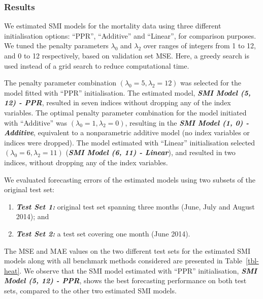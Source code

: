 \documentclass[
  11pt,
  a4paper,
]{article}
\providecommand{\tightlist}{%
  \setlength{\itemsep}{0pt}\setlength{\parskip}{0pt}}\usepackage{longtable,booktabs,array}
\begin{document}
\subsubsection{Results}\label{results}

We estimated SMI models for the mortality data using three different
initialisation options: ``PPR'', ``Additive'' and ``Linear'', for
comparison purposes. We tuned the penalty parameters \(\lambda_{0}\) and
\(\lambda_{2}\) over ranges of integers from 1 to 12, and 0 to 12
respectively, based on validation set MSE. Here, a greedy search is used
instead of a grid search to reduce computational time.

The penalty parameter combination
\((\lambda_{0} = 5, \lambda_{2} = 12)\) was selected for the model
fitted with ``PPR'' initialisation. The estimated model,
\textbf{\emph{SMI Model (5, 12) - PPR}}, resulted in seven indices
without dropping any of the index variables. The optimal penalty
parameter combination for the model initiated with ``Additive'' was
\((\lambda_{0} = 1, \lambda_{2} = 0)\), resulting in the
\textbf{\emph{SMI Model (1, 0) - Additive}}, equivalent to a
nonparametric additive model (no index variables or indices were
dropped). The model estimated with ``Linear'' initialisation selected
\((\lambda_{0} = 6, \lambda_{2} = 11)\) (\textbf{\emph{SMI Model (6, 11)
- Linear}}), and resulted in two indices, without dropping any of the
index variables.

We evaluated forecasting errors of the estimated models using two
subsets of the original test set:

\begin{enumerate}
\def\labelenumi{\arabic{enumi}.}
\tightlist
\item
  \textbf{\emph{Test Set 1:}} original test set spanning three months
  (June, July and August 2014); and
\item
  \textbf{\emph{Test Set 2:}} a test set covering one month (June 2014).
\end{enumerate}

The MSE and MAE values on the two different test sets for the estimated
SMI models along with all benchmark methods considered are presented in
Table~\ref{tbl-heat}. We observe that the SMI model estimated with
``PPR'' initialisation, \textbf{\emph{SMI Model (5, 12) - PPR}}, shows
the best forecasting performance on both test sets, compared to the
other two estimated SMI models.
\end{document}
